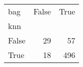 \begin{tabular}{lrr}
\toprule
bag &  False &  True  \\
knn   &        &        \\
\midrule
False &     29 &     57 \\
True  &     18 &    496 \\
\bottomrule
\end{tabular}
